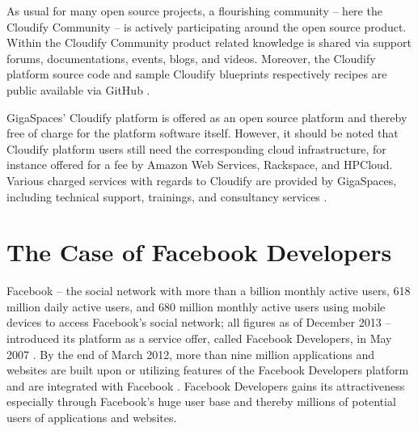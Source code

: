 As usual for many open source projects, a flourishing community -- here the Cloudify Community -- is actively participating around the open source product. Within the Cloudify Community product related knowledge is shared via support forums, documentations, events, blogs, and videos. Moreover, the Cloudify platform source code and sample Cloudify blueprints respectively recipes are public available via GitHub \citep{GigaSpaces2013b,GitHub2013,GitHub2013a}.

GigaSpaces' Cloudify platform is offered as an open source platform and thereby free of charge for the platform software itself. However, it should be noted that Cloudify platform users still need the corresponding cloud infrastructure, for instance offered for a fee by Amazon Web Services, Rackspace, and HPCloud. Various charged services with regards to Cloudify are provided by GigaSpaces, including technical support, trainings, and consultancy services \citep{GigaSpaces2013a}.



\section{The Case of Facebook Developers}\label{ch:sota:fd}

Facebook -- the social network with more than a billion monthly active users, 618 million daily active users, and 680 million monthly active users using mobile devices to access Facebook's social network; all figures as of December 2013 -- introduced its platform as a service offer, called Facebook Developers, in May 2007 \citep{Facebook2013}. By the end of March 2012, more than nine million applications and websites are built upon or utilizing features of the Facebook Developers platform and are integrated with Facebook \citep{Facebook2013}. Facebook Developers gains its attractiveness especially through Facebook's huge user base and thereby millions of potential users of applications and websites.

